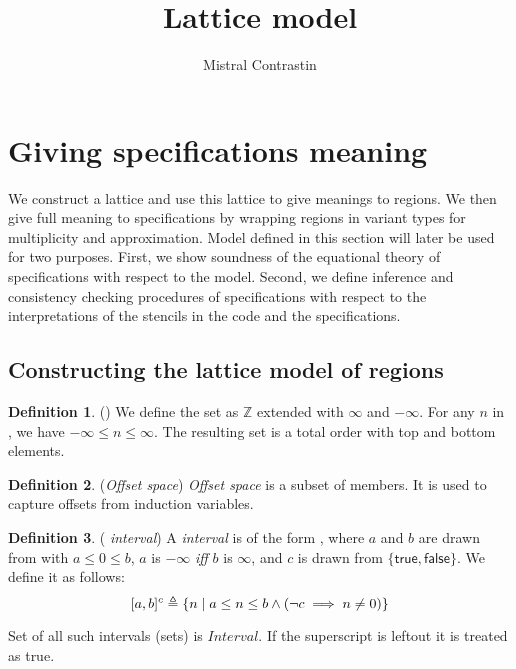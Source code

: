 \documentclass[acmlarge,review]{acmart}
\theoremstyle{definition}
\newtheorem{defn}{Definition}
\theoremstyle{plain}
\theoremstyle{remark}
\begin{document}
\title{Lattice model}
\author{Mistral Contrastin}

\section{Giving specifications meaning}

We construct a lattice and use this lattice to give meanings to regions. We
then give full meaning to specifications by wrapping regions in variant types
for multiplicity and approximation. Model defined in this section will later be
used for two purposes. First, we show soundness of the equational theory of
specifications with respect to the model. Second, we define inference and
consistency checking procedures of specifications with respect to the
interpretations of the stencils in the code and the specifications.

\subsection{Constructing the lattice model of regions}

\begin{defn}{(\zinf)}
  We define the set \zinf{} as $\mathbb{Z}$ extended with $\infty$ and
  $-\infty$. For any $n$ in \zinf{}, we have $-\infty \leq n \leq \infty$. The
  resulting set is a total order with top and bottom elements.
\end{defn}

\begin{defn}{(\emph{Offset space})}
  \emph{Offset space} is a subset of \zinf{} members. It is used to capture
  offsets from induction variables.
\end{defn}

\begin{defn}{(\emph{\zinf{} interval})}
  A \emph{\zinf{} interval} is of the form , where $a$ and $b$
  are drawn from \zinf{} with $a \leq 0 \leq b$, $a$ is $-\infty$ \emph{iff} $b$
  is $\infty$, and $c$ is drawn from $\{ \textsf{true}, \textsf{false} \}$. We
  define it as follows:
%
  \begin{equation*}
    \textnormal{$\lbrack a,b\rbrack^{c}$} \triangleq
      \{ n \;|\; a \leq n \leq b \wedge (\neg c \implies n \neq 0) \}
  \end{equation*}

  Set of all such intervals (sets) is $\textit{Interval}$. If the superscript is
  leftout it is treated as \textsf{true}.
\end{defn}
\end{document}

